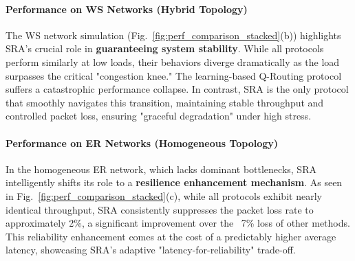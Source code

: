\documentclass[journal]{IEEEtran}
\begin{document}
\paragraph{Performance on WS Networks (Hybrid Topology)}
The WS network simulation (Fig.~\ref{fig:perf_comparison_stacked}(b)) highlights SRA's crucial role in \textbf{guaranteeing system stability}. While all protocols perform similarly at low loads, their behaviors diverge dramatically as the load surpasses the critical "congestion knee." The learning-based Q-Routing protocol suffers a catastrophic performance collapse. In contrast, SRA is the only protocol that smoothly navigates this transition, maintaining stable throughput and controlled packet loss, ensuring "graceful degradation" under high stress.

\paragraph{Performance on ER Networks (Homogeneous Topology)}
In the homogeneous ER network, which lacks dominant bottlenecks, SRA intelligently shifts its role to a \textbf{resilience enhancement mechanism}. As seen in Fig.~\ref{fig:perf_comparison_stacked}(c), while all protocols exhibit nearly identical throughput, SRA consistently suppresses the packet loss rate to approximately 2\%, a significant improvement over the ~7\% loss of other methods. This reliability enhancement comes at the cost of a predictably higher average latency, showcasing SRA's adaptive "latency-for-reliability" trade-off.
\end{document}
